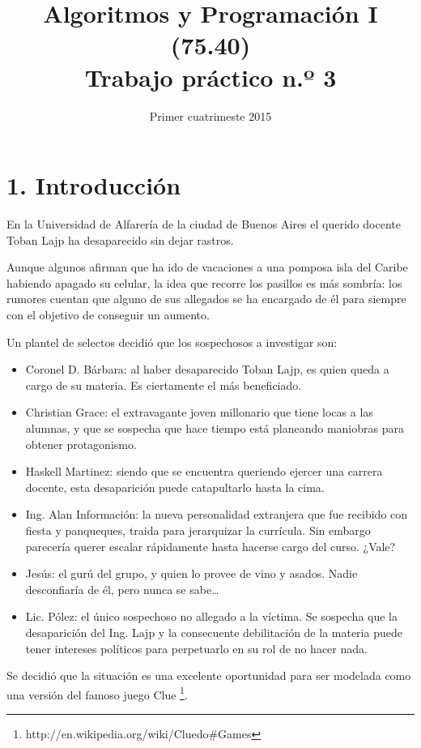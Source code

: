 \documentclass[12pt,spanish,]{article}
\title{Algoritmos y Programación I (75.40)\\Trabajo práctico n.º 3}
\date{Primer cuatrimeste 2015}
\begin{document}
\maketitle

\section{1. Introducción}\label{introducciuxf3n}

En la Universidad de Alfarería de la ciudad de Buenos Aires el querido
docente Toban Lajp ha desaparecido sin dejar rastros.

Aunque algunos afirman que ha ido de vacaciones a una pomposa isla del
Caribe habiendo apagado su celular, la idea que recorre los pasillos es
más sombría: los rumores cuentan que alguno de sus allegados se ha
encargado de él para siempre con el objetivo de conseguir un aumento.

Un plantel de selectos decidió que los sospechosos a investigar son:

\begin{itemize}
\itemsep1pt\parskip0pt
\item
  Coronel D. Bárbara: al haber desaparecido Toban Lajp, es quien queda a
  cargo de su materia. Es ciertamente el más beneficiado.
\item
  Christian Grace: el extravagante joven millonario que tiene locas a
  las alumnas, y que se sospecha que hace tiempo está planeando
  maniobras para obtener protagonismo.
\item
  Haskell Martinez: siendo que se encuentra queriendo ejercer una
  carrera docente, esta desaparición puede catapultarlo hasta la cima.
\item
  Ing. Alan Información: la nueva personalidad extranjera que fue
  recibido con fiesta y panqueques, traida para jerarquizar la
  currícula. Sin embargo parecería querer escalar rápidamente hasta
  hacerse cargo del curso. ¿Vale?
\item
  Jesús: el gurú del grupo, y quien lo provee de vino y asados. Nadie
  desconfiaría de él, pero nunca se sabe\ldots{}
\item
  Lic. Pólez: el único sospechoso no allegado a la víctima. Se sospecha
  que la desaparición del Ing. Lajp y la consecuente debilitación de la
  materia puede tener intereses políticos para perpetuarlo en su rol de
  no hacer nada.
\end{itemize}

Se decidió que la situación es una excelente oportunidad para ser
modelada como una versión del famoso juego Clue \footnote{http://en.wikipedia.org/wiki/Cluedo\#Games}.
\end{document}
